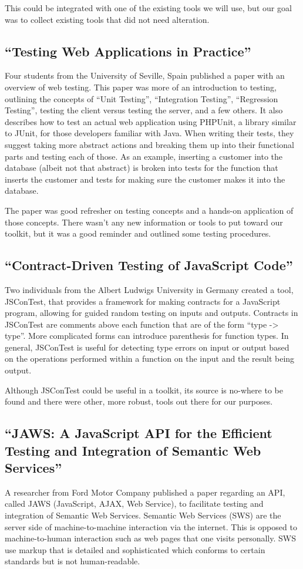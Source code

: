 \documentclass[12pt]{ucthesis}
\begin{document}
This could be integrated with one of the existing tools we will use, but our goal was to collect existing tools that did not need alteration.

\subsection{``Testing Web Applications in Practice''}
Four students from the University of Seville, Spain published a paper with an overview of web testing\cite{TestingInPractice}. This paper was more of an introduction to testing, outlining the concepts of “Unit Testing”, “Integration Testing”, “Regression Testing”, testing the client versus testing the server, and a few others. It also describes how to test an actual web application using PHPUnit, a library similar to JUnit, for those developers familiar with Java. When writing their tests, they suggest taking more abstract actions and breaking them up into their functional parts and testing each of those. As an example, inserting a customer into the database (albeit not that abstract) is broken into tests for the function that inserts the customer and tests for making sure the customer makes it into the database.

The paper was good refresher on testing concepts and a hands-on application of those concepts. There wasn't any new information or tools to put toward our toolkit, but it was a good reminder and outlined some testing procedures.

\subsection{``Contract-Driven Testing of JavaScript Code''}
Two individuals from the Albert Ludwigs University in Germany created a tool, JSConTest, that provides a framework for making contracts for a JavaScript program, allowing for guided random testing on inputs and outputs\cite{ContractDrivenTesting}. Contracts in JSConTest are comments above each function that are of the form ``type -> type''. More complicated forms can introduce parenthesis for function types. In general, JSConTest is useful for detecting type errors on input or output based on the operations performed within a function on the input and the result being output. 

Although JSConTest could be useful in a toolkit, its source is no-where to be found and there were other, more robust, tools out there for our purposes.

\subsection{``JAWS: A JavaScript API for the Efficient Testing and Integration of Semantic Web Services''}
A researcher from Ford Motor Company published a paper regarding an API, called JAWS (JavaScript, AJAX, Web Service), to facilitate testing and integration of Semantic Web Services\cite{JAWS}. Semantic Web Services (SWS) are the server side of machine-to-machine interaction via the internet. This is opposed to machine-to-human interaction such as web pages that one visits personally. SWS use markup that is detailed and sophisticated which conforms to certain standards but is not human-readable.
\end{document}
